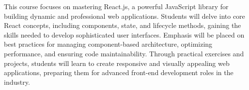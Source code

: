 This course focuses on mastering React.js, a powerful JavaScript library for building dynamic and professional web applications.
Students will delve into core React concepts, including components, state, and lifecycle methods, gaining the skills needed to develop sophisticated user interfaces.
Emphasis will be placed on best practices for managing component-based architecture, optimizing performance, and ensuring code maintainability.
Through practical exercises and projects, students will learn to create responsive and visually appealing web applications, preparing them for advanced front-end development roles in the industry.
